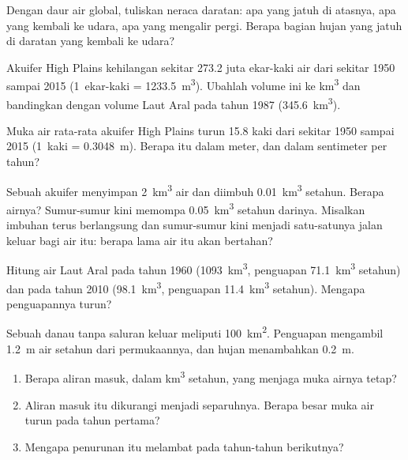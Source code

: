 \begin{exercise}[$\star\star$]\label{exo:g10:freshwater-resources:8}
Dengan  daur air global, tuliskan neraca daratan: apa yang jatuh
di atasnya, apa yang kembali ke udara, apa yang mengalir pergi. Berapa bagian
hujan yang jatuh di daratan yang kembali ke udara?
\end{exercise}

\begin{exercise}[$\star\star$]\label{exo:g10:freshwater-resources:9}
Akuifer High Plains kehilangan sekitar \num{273.2} juta ekar-kaki air dari
sekitar 1950 sampai 2015 (\num{1}~ekar-kaki = \qty{1233.5}{m^3}). Ubahlah
volume ini ke \unit{km^3} dan bandingkan dengan volume Laut Aral pada tahun
1987 (\qty{345.6}{km^3}).
\end{exercise}

\begin{exercise}[$\star\star$]\label{exo:g10:freshwater-resources:10}
Muka air rata-rata akuifer High Plains turun \num{15.8} kaki dari sekitar 1950
sampai 2015 (\num{1}~kaki = \qty{0.3048}{m}). Berapa itu dalam meter, dan dalam
sentimeter per tahun?
\end{exercise}

\begin{exercise}[$\star\star$]\label{exo:g10:freshwater-resources:11}
Sebuah akuifer menyimpan \qty{2}{km^3} air dan diimbuh \qty{0.01}{km^3}
setahun. Berapa  airnya? Sumur-sumur kini memompa
\qty{0.05}{km^3} setahun darinya. Misalkan imbuhan terus berlangsung dan
sumur-sumur kini menjadi satu-satunya jalan keluar bagi air itu: berapa lama
air itu akan bertahan?
\end{exercise}

\begin{exercise}[$\star\star\star$]\label{exo:g10:freshwater-resources:12}
Hitung  air Laut Aral pada tahun 1960 (\qty{1093}{km^3},
penguapan \qty{71.1}{km^3} setahun) dan pada tahun 2010 (\qty{98.1}{km^3},
penguapan \qty{11.4}{km^3} setahun). Mengapa penguapannya turun?
\end{exercise}

\begin{exercise}[$\star\star\star$]\label{exo:g10:freshwater-resources:13}
Sebuah danau tanpa saluran keluar meliputi \qty{100}{km^2}. Penguapan
mengambil \qty{1.2}{m} air setahun dari permukaannya, dan hujan menambahkan
\qty{0.2}{m}.
\begin{enumerate}
  \item Berapa aliran masuk, dalam \unit{km^3} setahun, yang menjaga muka
        airnya tetap?
  \item Aliran masuk itu dikurangi menjadi separuhnya. Berapa besar muka air
        turun pada tahun pertama?
  \item Mengapa penurunan itu melambat pada tahun-tahun berikutnya?
\end{enumerate}
\end{exercise}

